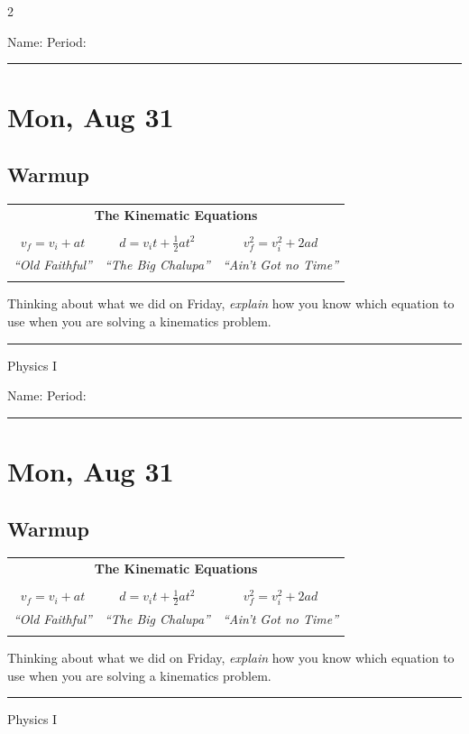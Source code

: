 \documentclass[10pt,landscape]{exam}
\def\todayDate{Mon, Aug 31}
\def\content{

  \begin{center}
    \begin{tabular}{|*3c|}
      \hline 
      \multicolumn{3}{|c|}{\bf The Kinematic Equations} \\
      &&\\
      $v_f=v_i+at$ &
      $d=v_i t + \tfrac{1}{2} at^2$ &
      $v_f^2 = v_i^2 + 2ad$ \\
      \it\small ``Old Faithful'' &
      \it\small ``The Big Chalupa'' &
      \it\small ``Ain't Got no Time'' \\
      &&\\
      \hline
    \end{tabular}
  \end{center}

\noindent
Thinking about what we did on Friday, \emph{explain} how you know which equation to use when you are solving a kinematics problem.
}
\begin{document}
\pagestyle{empty}

\setlength{\columnsep}{0.8in}
\begin{multicols*}{2}

\noindent  
Name: \hfill Period: \hspace{5em}
\vspace{0.5em}
\hrule

\section*{\todayDate}
\subsection*{Warmup}

\content

\vfill
\hrule
\vspace{0.5em}
\hfill {\sc Physics I}

\columnbreak

\noindent  
Name: \hfill Period: \hspace{5em}
\vspace{0.5em}
\hrule

\section*{\todayDate}
\subsection*{Warmup}

\content

\vfill
\hrule
\vspace{0.5em}
\hfill {\sc Physics I}

\end{multicols*}
\end{document}
